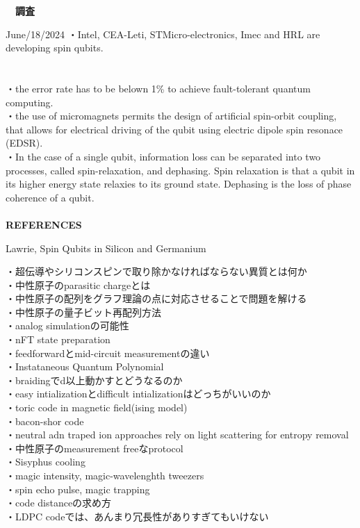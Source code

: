 \documentclass[a4paper,10.5pt]{ltjsarticle}
\begin{document}
\centerline
{\huge \bfseries　調査}
\rightline
{June/18/2024}
\leftline
{}
・Intel, CEA-Leti, STMicro-electronics, Imec and HRL are developing spin qubits.\\
\\
\\
・the error rate has to be belown 1\% to achieve fault-tolerant quantum computing.\\
・the use of micromagnets permits the design of artificial spin-orbit coupling, that allows for electrical driving of the qubit using electric dipole spin resonace (EDSR).\\
・In the case of a single qubit, information loss can be separated into two processes, called spin-relaxation, and dephasing. Spin relaxation is that a qubit in its higher energy state relaxies to its ground state. Dephasing  is the loss of phase coherence of a qubit.\\
\\
{\Large \bfseries REFERENCES}
\begin{thebibliography}{1}
\vspace{-1.5cm}
   Lawrie, Spin Qubits in Silicon and Germanium
\end{thebibliography}
\vspace{50pt}
・超伝導やシリコンスピンで取り除かなければならない異質とは何か\\
・中性原子のparasitic chargeとは\\
・中性原子の配列をグラフ理論の点に対応させることで問題を解ける\\
・中性原子の量子ビット再配列方法\\
・analog simulationの可能性\\
・nFT state preparation\\
・feedforwardとmid-circuit measurementの違い\\
・Instataneous Quantum Polynomial\\
・braidingでd以上動かすとどうなるのか\\
・easy intializationとdifficult intializationはどっちがいいのか\\
・toric code in magnetic field(ising model)\\
・bacon-shor code\\
・neutral adn traped ion approaches rely on light scattering for entropy removal\\
・中性原子のmeasurement freeなprotocol\\
・Sisyphus cooling\\
・magic intensity, magic-wavelenghth tweezers\\
・spin echo pulse, magic trapping\\
・code distanceの求め方\\
・LDPC codeでは、あんまり冗長性がありすぎてもいけない\\
\end{document}
